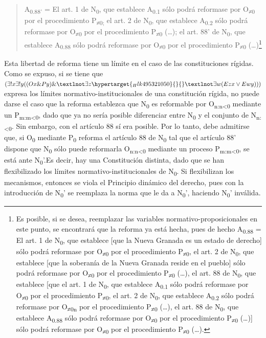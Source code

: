 \documentclass[]{book}
\begin{document}
\begin{refsection}
\begin{quote}
A\textsubscript{0.88'} = El art. 1 de N\textsubscript{0}, que establece
A\textsubscript{0.1} sólo podrá reformase por O\textsubscript{≠0} por el
procedimiento P\textsubscript{≠0;} el art. 2 de N\textsubscript{0}, que
establece A\textsubscript{0.2} sólo podrá reformase por
O\textsubscript{≠0} por el procedimiento P\textsubscript{≠0} (\ldots{});
el art. 88' de N\textsubscript{0}, que establece A\textsubscript{0.88}
sólo podrá reformase por O\textsubscript{≠0} por el procedimiento
P\protect\hypertarget{_Hlk494053794}{}{}\textsubscript{≠0}
(\ldots{})\footnote{Es posible, si se desea, reemplazar las variables
  normativo-proposicionales en este punto, se encontrará que la reforma
  ya está hecha, pues de hecho A\textsubscript{0.88} = El art. 1 de
  N\textsubscript{0}, que establece {[}que la Nueva Granada es un estado
  de derecho{]} sólo podrá reformase por O\textsubscript{≠0} por el
  procedimiento P\textsubscript{≠0}, el art. 2 de N\textsubscript{0},
  que establece {[}que la soberanía de la Nueva Granada reside en el
  pueblo{]} sólo podrá reformase por O\textsubscript{≠0} por el
  procedimiento P\textsubscript{≠0} (\ldots{}), el art. 88 de
  N\textsubscript{0}, que establece {[}que el art. 1 de
  N\textsubscript{0}, que establece A\textsubscript{0.1} sólo podrá
  reformase por O\textsubscript{≠0} por el procedimiento
  P\textsubscript{≠0}, el art. 2 de N\textsubscript{0}, que establece
  A\textsubscript{0.2} sólo podrá reformase por O\textsubscript{≠0n} por
  el procedimiento P\textsubscript{≠0} (\ldots{}), el art. 88 de
  N\textsubscript{0}, que establece A\textsubscript{0.88} sólo podrá
  reformase por O\textsubscript{≠0} por el procedimiento
  P\textsubscript{≠0} (\ldots{}){]} sólo podrá reformase por
  O\textsubscript{≠0} por el procedimiento P\textsubscript{≠0}
  (\ldots{}).}
\end{quote}

Esta libertad de reforma tiene un límite en el caso de las
constituciones rígidas. Como se expuso, si se tiene que $(\exists!x \exists!y ((Ox \&Py) \& ¬\exists z \protect\hypertarget{_Hlk495321050}{}{}¬\exists w (Ezx \lor Ewy)))$
expresa los límites normativo-institucionales de una constitución
rígida, no puede darse el caso que la reforma establezca que
N\textsubscript{0} es reformable por O\textsubscript{n:n\textless{}0}
mediante un P\textsubscript{m:m\textless{}0}, dado que ya no sería
posible diferenciar entre N\textsubscript{0} y el conjunto de
N\textsubscript{n:\textless{}0}. Sin embargo, con el artículo 88 sí era
posible. Por lo tanto, debe admitirse que, si O\textsubscript{0}
mediante P\textsubscript{0} reforma el artículo 88 de N\textsubscript{0}
tal que el artículo 88' dispone que N\textsubscript{0} sólo puede
reformarla O\textsubscript{n:n\textless{}0} mediante un proceso
P\textsubscript{m:m\textless{}0}, se está ante N\textsubscript{0}'.Es
decir, hay una Constitución distinta, dado que se han flexibilizado los
límites normativo-institucionales de N\textsubscript{0}. Si flexibilizan los mecanismos, entonces se viola el Principio dinámico del derecho, pues con la introducción de N\textsubscript{0}' se reemplaza la norma que le da a N\textsubscript{0}', haciendo N\textsubscript{0}' inválida.


\end{refsection}
\end{document}

